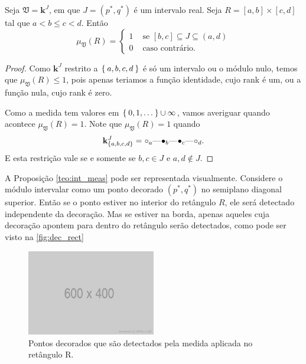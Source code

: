 \begin{propo}\label{teo:int_meas}
    Seja $\mathfrak{V} = \mathbf{k}^J$, em que $J=(p^*, q^*)$ é um intervalo real. Seja $R=[a,b]\times[c,d]$
    tal que $a < b \leq c < d$. Então
    \begin{equation*}
        \mu_{\mathfrak{V}}(R) = \left\{
        \begin{split}
            1 & \text{ se } [b,c] \subseteq J \subseteq (a,d) \\
            0 & \text{ caso contrário.}
        \end{split}
        \right.
    \end{equation*}
\end{propo} 
\begin{proof}
    Como $\mathbf{k}^J$ restrito a $\Set{a,b,c,d}$ é só um intervalo ou o módulo nulo, temos que $\mu_{\mathfrak{V}}(R)
    \leq 1$, pois apenas teriamos a função identidade, cujo rank é um, ou a função nula, cujo rank é zero. 

    Como a medida tem valores em $\Set{0,1,\dots} \cup {\infty}$, vamos averiguar quando acontece $\mu_{\mathfrak{V}}(R)
    = 1$. Note que $\mu_{\mathfrak{V}}(R) = 1$ quando 
    \begin{equation*}    
        \mathbf{k}^J_{\{a,b,c,d\}} = \qoff{a} \qem \qon{b} \qem \qon{c} \qem \qoff{d}. 
    \end{equation*}
    E esta restrição vale se e somente se $b,c \in J$ e $a,d \nin J$.
\end{proof}

A Proposição \ref{teo:int_meas} pode ser representada visualmente. Considere o módulo intervalar como um ponto
decorado $(p^*, q^*)$ no semiplano diagonal superior. Então se o ponto estiver no interior do retângulo
$R$, ele será detectado independente da decoração. Mas se estiver na borda, apenas aqueles cuja decoração
apontem para dentro do retângulo serão detectados, como pode ser visto na \autoref{fig:dec_rect}
\begin{figure}[htpb!]
    \centering
    \includegraphics[width=0.5\textwidth]{images/placeholder.png}
    \caption{Pontos decorados que são detectados pela medida aplicada no retângulo R.}
    \label{fig:dec_rect}
\end{figure}

